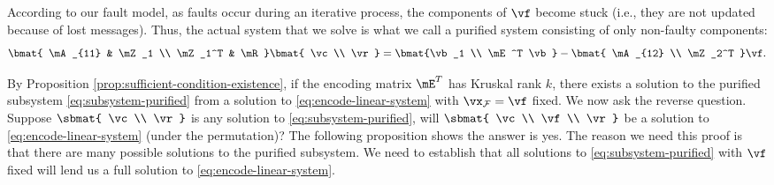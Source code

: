 \documentclass[11pt]{article}
\newcommand{\sF}{{\mathcal{F}}}
\begin{document}
According to our fault model, as faults occur during an iterative process,
the components of $\vf$ become stuck (i.e., they are not updated because of lost messages).
Thus, the actual system that we solve is what we call a purified system consisting
of only non-faulty components:
\begin{equation} \label{eq:subsystem-purified}
\bmat{ \mA_{11} & \mZ_1 \\
       \mZ_1^T & \mR }
\bmat{ \vc \\ \vr }
= \bmat{\vb_1 \\ \mE^T \vb } - \bmat{ \mA_{12} \\ \mZ_2^T } \vf. 
\end{equation}			

By Proposition \ref{prop:sufficient-condition-existence}, if the encoding
matrix $\mE^T$ has Kruskal rank $k$, there exists a solution to the purified
subsystem \eqref{eq:subsystem-purified} from a solution to \eqref{eq:encode-linear-system}
with $\vx_{\sF} =\vf$ fixed. We now ask the reverse question.
Suppose $\sbmat{ \vc \\ \vr}$ is any solution to \eqref{eq:subsystem-purified},
will $\sbmat{ \vc\\ \vf \\ \vr}$ be a solution to \eqref{eq:encode-linear-system}
(under the permutation)?  The following proposition shows the answer is yes.
The reason we need this proof is that there are many possible solutions to
the purified subsystem. We need to establish that all solutions to
\eqref{eq:subsystem-purified} with $\vf$ fixed will lend us a full solution
to \eqref{eq:encode-linear-system}. 
\end{document}
